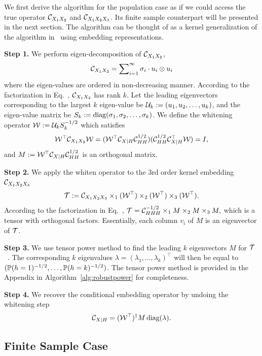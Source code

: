 \documentclass{article}
\begin{document}
We first derive the algorithm for the population case as if we could access the true operator $\mathcal{C}_{X_1 X_2}$ and $\mathcal{C}_{X_1 X_2 X_3}$. Its finite sample counterpart  will be presented in the next section. The algorithm can be thought of as a kernel generalization of the algorithm in~\citet{AnandkumarEtal:community12} using embedding representations.

{\bf Step 1.} We perform eigen-decomposition of $\mathcal{C}_{X_1 X_2}$,
$$\mathcal{C}_{X_1 X_2} = \sum\nolimits_{i=1}^{\infty} \sigma_i \cdot u_i \otimes u_i$$
where the eigen-values are ordered in non-decreasing manner.
According to the factorization in Eq.~, $\mathcal{C}_{X_1 X_2}$ has rank $k$.
Let the leading eigenvectors corresponding to the largest $k$ eigen-value be  $\mathcal{U}_k:=(u_1,u_2,\ldots,u_k)$, and the eigen-value matrix be $S_k:=\mathop{\mathrm{diag}}(\sigma_1,\sigma_2,\ldots,\sigma_k)$. We define the whitening operator $\mathcal{W}:= \mathcal{U}_k S_k^{-1/2}$ which satisfies
\begin{align*}
  \mathcal{W}^\top \mathcal{C}_{X_1X_2} \mathcal{W} = (\mathcal{W}^\top \mathcal{C}_{X|H} \mathcal{C}_{HH}^{1/2}) (\mathcal{C}_{HH}^{1/2} \mathcal{C}_{X|H}^\top \mathcal{W}) = I,
\end{align*}
and $M:=\mathcal{W}^\top \mathcal{C}_{X|H} \mathcal{C}_{HH}^{1/2}$ is an orthogonal matrix.

{\bf Step 2.} We apply the whiten operator to the 3rd order kernel embedding $\mathcal{C}_{X_1 X_2 X_3}$
$$
  {\mathcal{T}} := \mathcal{C}_{X_1 X_2 X_3} \times_1 (\mathcal{W}^\top) \times_2 (\mathcal{W}^\top) \times_3 (\mathcal{W}^\top).
$$
According to the factorization in Eq.~,
$
  {\mathcal{T}} = \mathcal{C}_{HHH}^{-1/2} \times_1 M \times_2 M \times_3 M,
$
which is a tensor with orthogonal factors. Essentially, each column $v_i$ of $M$ is an eigenvector of ${\mathcal{T}}$.

{\bf Step 3.} We use tensor power method to find the leading $k$ eigenvectors $M$ for ${\mathcal{T}}$~\cite{AnandkumarEtal:tensor12}. The corresponding $k$ eigenvalues $\lambda = (\lambda_1,\ldots,\lambda_k)^\top$ will then be equal to $(\mathbb{P}(h=1)^{-1/2},\ldots,\mathbb{P}(h=k)^{-1/2})$. The tensor power method is provided in the Appendix in Algorithm~\ref{alg:robustpower} for completeness.

{\bf Step 4.} We recover the conditional embedding operator by undoing the whitening step
$$
  \mathcal{C}_{X|H} = (\mathcal{W}^\top)^\dagger M \mathop{\mathrm{diag}}(\lambda).
$$

\vspace{-3mm}
\subsection{Finite Sample Case}\label{sec:sample}
\vspace{-2mm}
\end{document}
